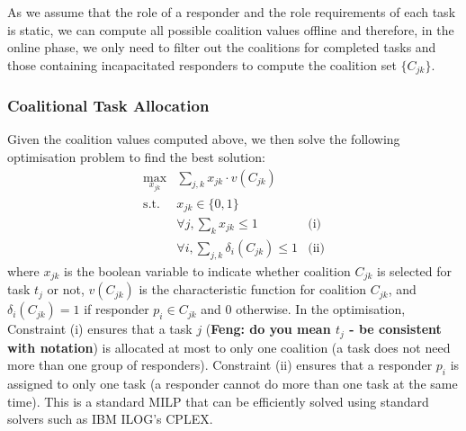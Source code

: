  As we assume that the role of a responder and the role requirements of each task is static, we can
compute all possible coalition values offline and therefore, in the online phase,
we only need to filter out the coalitions for completed tasks and those containing incapacitated responders to compute the coalition set $\{ C_{jk}
\}$.  

\subsubsection{Coalitional Task Allocation}
Given the coalition values computed above, we then solve the following
optimisation problem to find the best solution:
\begin{equation}
  \begin{array}{lll}
    \max\limits_{x_{jk}} & \sum_{j, k} x_{jk} \cdot v(C_{jk}) & \\[2pt]
    \mbox{s.t.} & x_{jk} \in \{0, 1\} & \\[2pt]
    & \forall j, \sum_{k} x_{jk} \leq 1 & \mbox{(i)} \\[2pt]
    & \forall i, \sum_{j, k} \delta_i(C_{jk}) \leq 1 & \mbox{(ii)}
  \end{array}
  \label{eq:cf}
\end{equation}
where $x_{jk}$ is the boolean variable to indicate whether
coalition $C_{jk}$ is selected for task $t_j$ or not, $v(C_{jk})$
is the characteristic function for coalition $C_{jk}$, and
$\delta_i(C_{jk}) = 1$ if responder $p_i\in C_{jk}$ and 0
otherwise. In the optimisation, Constraint (i) ensures that a task
$j$ (\textbf{Feng: do you mean $t_j$ - be consistent with notation}) is allocated at most to only one coalition (a task does not
need more than one group of responders). Constraint (ii) ensures
that a responder $p_i$ is assigned to only one task (a responder cannot
do more than one task at the same time). This is a standard MILP
that can be efficiently solved  using standard solvers such as IBM ILOG's CPLEX. 

